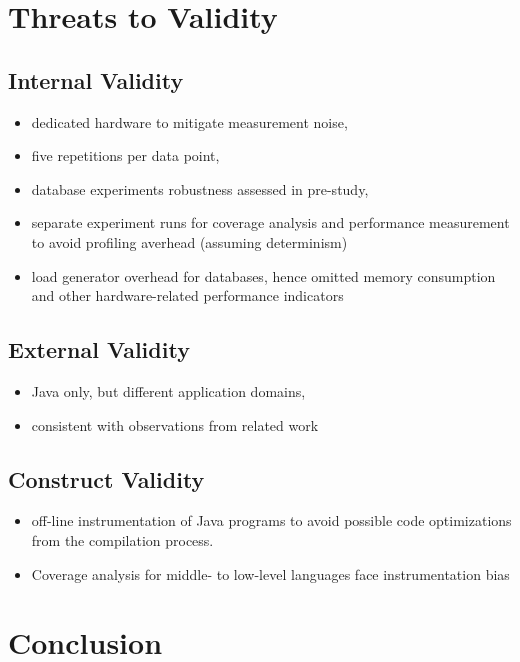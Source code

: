 \section{Threats to Validity}
\subsection{Internal Validity}
\begin{itemize}
	\item dedicated hardware to mitigate measurement noise, 
	\item five repetitions per data point, 
	\item database experiments robustness assessed in pre-study,
	\item separate experiment runs for coverage analysis and performance measurement to avoid profiling averhead (assuming determinism)
	\item load generator overhead for databases, hence omitted memory consumption and other hardware-related performance indicators 
\end{itemize}
\subsection{External Validity}
\begin{itemize}
	\item Java only, but different application domains,
	\item consistent with observations from related work
\end{itemize}

\subsection{Construct Validity}
\begin{itemize}
	\item off-line instrumentation of Java programs to avoid possible code optimizations from the compilation process. 
	\item Coverage analysis for middle- to low-level languages face instrumentation bias
\end{itemize}

\section{Conclusion}

